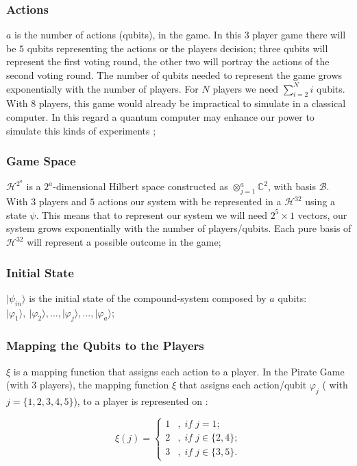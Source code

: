 \documentclass[10pt,twocolumn]{llncs}
\begin{document}
\subsubsection{Actions} $a$ is the number of actions (qubits), in the game. In this $3$ player game there will be $5$ qubits representing the actions or the players decision; three qubits will represent the first voting round, the other two will portray the actions of the second voting round.
The number of qubits needed to represent the game grows exponentially with the number of players. For $N$ players we need $\sum_{i=2}^{N}{i}$ qubits. With 8 players, this game would already be impractical to simulate in a classical computer. In this regard a quantum computer may enhance our power to simulate this kinds of experiments \cite{Rieffel2011}; 

\subsubsection{Game Space} $\mathcal{H}^{2^{a}}$ is a $2^{a}$-dimensional Hilbert space constructed
as $\otimes_{j=1}^{a}\mathbb{C}^{2}$, with basis $\mathcal{B}$. With $3$ players and $5$ actions our system with be represented in a $\mathcal{H}^{32}$ using a state $\psi$. This means that to represent our system we will need $2^{5}\times 1$ vectors, our system grows exponentially with the number of players/qubits. Each pure basis  of $\mathcal{H}^{32}$ will represent a possible outcome in the game;

\subsubsection{Initial State} $\vert\psi_{in}\rangle$ is the initial state of the compound-system
composed by $a$ qubits: $\vert\varphi_{1}\rangle,\:\vert\varphi_{2}\rangle, ..., \vert\varphi_{j}\rangle, ..., \vert\varphi_{a}\rangle$;

\subsubsection{Mapping the Qubits to the Players} $\xi$ is a mapping function that assigns each action to a player. In the Pirate Game (with $3$ players), the mapping function $\xi$ that assigns each action/qubit $\varphi_{j}$ ( with $j=\{ 1, 2, 3, 4, 5\}$), to a player is represented on :

\begin{equation}
\xi(j)=\begin{cases}
1 & ,\; if\; j=1;\\
2 & ,\; if\; j\in\{2,4\};\\
3 & ,\; if\; j\in\{3,5\}.
\end{cases}
\label{playerxiximapping}
\end{equation}
\end{document}
